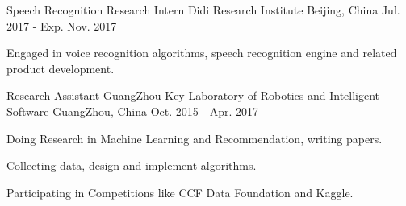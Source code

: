 \begin{cventries}
  \cventry
    {Speech Recognition Research Intern}
    {Didi Research Institute}
    {Beijing, China}
    {Jul. 2017 - Exp. Nov. 2017}
    {
      \begin{cvitems}
        \item {Engaged in voice recognition algorithms, speech recognition engine and related product development.}
      \end{cvitems}
    }
  \cventry
    {Research Assistant}
    {GuangZhou Key Laboratory of Robotics and Intelligent Software}
    {GuangZhou, China}
    {Oct. 2015 - Apr. 2017}
    {
      \begin{cvitems}
        \item {Doing Research in Machine Learning and Recommendation, writing papers.}
        \item {Collecting data, design and implement algorithms.}
        \item {Participating in Competitions like CCF Data Foundation and Kaggle.}
      \end{cvitems}
    }
\end{cventries}